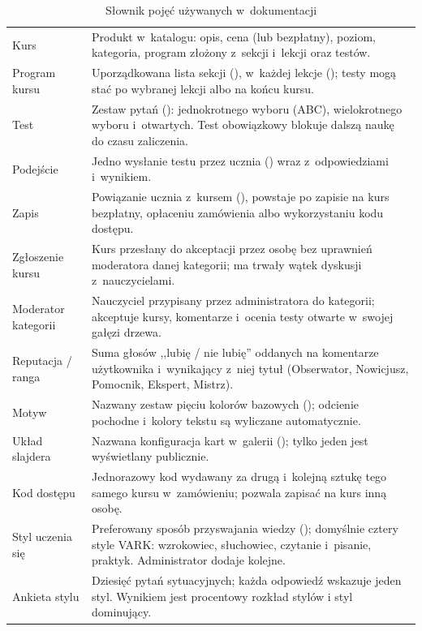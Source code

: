 \begin{table}[H]
\centering\small
\caption{Słownik pojęć używanych w~dokumentacji}
\begin{tabularx}{\linewidth}{@{}P{3.6cm}L@{}}
\toprule
{} &  \\
\midrule
Kurs & Produkt w~katalogu: opis, cena (lub bezpłatny), poziom, kategoria, program złożony z~sekcji i~lekcji oraz testów. \\
Program kursu & Uporządkowana lista sekcji (), w~każdej lekcje (); testy mogą stać po wybranej lekcji albo na końcu kursu. \\
Test & Zestaw pytań (): jednokrotnego wyboru (ABC), wielokrotnego wyboru i~otwartych. Test obowiązkowy blokuje dalszą naukę do czasu zaliczenia. \\
Podejście & Jedno wysłanie testu przez ucznia () wraz z~odpowiedziami i~wynikiem. \\
Zapis & Powiązanie ucznia z~kursem (), powstaje po zapisie na kurs bezpłatny, opłaceniu zamówienia albo wykorzystaniu kodu dostępu. \\
Zgłoszenie kursu & Kurs przesłany do akceptacji przez osobę bez uprawnień moderatora danej kategorii; ma trwały wątek dyskusji z~nauczycielami. \\
Moderator kategorii & Nauczyciel przypisany przez administratora do kategorii; akceptuje kursy, komentarze i~ocenia testy otwarte w~swojej gałęzi drzewa. \\
Reputacja / ranga & Suma głosów ,,lubię / nie lubię'' oddanych na komentarze użytkownika i~wynikający z~niej tytuł (Obserwator, Nowicjusz, Pomocnik, Ekspert, Mistrz). \\
Motyw & Nazwany zestaw pięciu kolorów bazowych (); odcienie pochodne i~kolory tekstu są wyliczane automatycznie. \\
Układ slajdera & Nazwana konfiguracja kart w~galerii (); tylko jeden jest wyświetlany publicznie. \\
Kod dostępu & Jednorazowy kod wydawany za drugą i~kolejną sztukę tego samego kursu w~zamówieniu; pozwala zapisać na kurs inną osobę. \\
Styl uczenia się & Preferowany sposób przyswajania wiedzy (); domyślnie cztery style VARK: wzrokowiec, słuchowiec, czytanie i~pisanie, praktyk. Administrator dodaje kolejne. \\
Ankieta stylu & Dziesięć pytań sytuacyjnych; każda odpowiedź wskazuje jeden styl. Wynikiem jest procentowy rozkład stylów i styl dominujący. \\

\end{tabularx}
\end{table}
